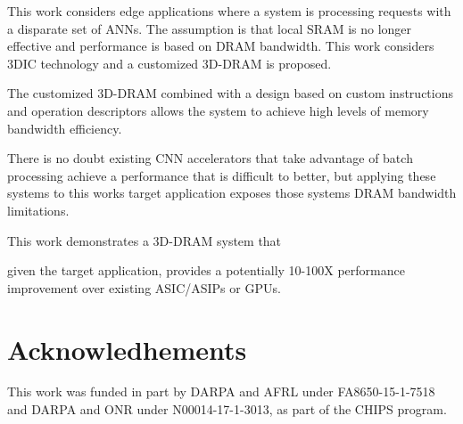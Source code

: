 \documentclass[journal]{IEEEtran}
\begin{document}
This work considers edge applications where a system is processing requests with a disparate set of ANNs. The assumption is that local SRAM is no longer effective and performance is based on DRAM bandwidth.
This work considers 3DIC technology and a customized 3D-DRAM is proposed. 

The customized 3D-DRAM combined with a design based on custom instructions and operation descriptors allows the system to achieve high levels of memory bandwidth efficiency.

There is no doubt existing CNN accelerators that take advantage of batch processing achieve a performance that is difficult to better, but applying these systems to this works target application exposes those systems DRAM bandwidth limitations.

This work demonstrates a 3D-DRAM system that 
\iffalse
at the surface has a relatively low FLOPs, but considering the target applcation is memory bound this work is potentially 10-100X better that existing ASIC/ASIPs or GPUs.
\else
given the target application, provides a potentially 10-100X performance improvement over existing ASIC/ASIPs or GPUs.
\fi

\section{Acknowledhements}
\label{sec:Acknowledhements}
This work was funded in part by DARPA and AFRL under FA8650-15-1-7518 and DARPA and ONR under N00014-17-1-3013, as part of the CHIPS program.

\iffalse
\end{document}
